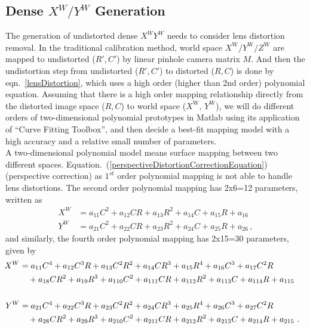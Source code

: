 \subsection{Dense \(X^W/Y^W\) Generation}
\indent
The generation of undistorted dense \(X^WY^W\) needs to consider lens distortion removal. In the traditional calibration method, world space \(X^\text{W}/Y^\text{W}/Z^\text{W}\) are mapped to undistorted (\(R', C'\)) by linear pinhole camera matrix \(M\). And then the undistortion step from undistorted (\(R', C'\)) to distorted (\(R, C\)) is done by eqn.~\ref{lensDistortion}, which uses a high order (higher than 2nd order) polynomial equation. Assuming that there is a high order mapping relationship directly from the distorted image space (\(R, C\)) to world space (\(X^\text{W}, \, Y^\text{W}\)), we will do different orders of two-dimensional polynomial prototypes in Matlab using its application of \enquote{Curve Fitting Toolbox}, and then decide a best-fit mapping model with a high accuracy and a relative small number of parameters.
%
\\\indent
A two-dimensional polynomial model means surface mapping between two different spaces. Equation.~(\ref{perspectiveDistortionCorrectionEquation}) (perspective correction) as \(1^{st}\) order polynomial mapping is not able to handle lens distortions. 
%
The second order polynomial mapping has 2x6=12 parameters, written as %
%
\begin{equation}
\begin{aligned}
X^W &=  a_{11}C^2 + a_{12}CR + a_{13}R^2 + a_{14}C + a_{15}R + a_{16}
\\%
Y^W &=  a_{21}C^2 + a_{22}CR + a_{23}R^2 + a_{24}C + a_{25}R + a_{26} \, , 
\end{aligned}
\label{secondOrderPolynomial}
\end{equation}%
%
\noindent
and similarly, the fourth order polynomial mapping has 2x15=30 parameters, given by 
%
\begin{equation}
\hspace*{-0.3cm}%
\begin{aligned}
X^W &=  a_{11}C^4 + a_{12}C^3R + a_{13}C^2R^2 + a_{14}CR^3 + a_{15}R^4 + a_{16}C^3 + a_{17}C^2R \\%
&\,\,\,\,\,\,+ a_{18}CR^2 + a_{19}R^3 + a_{110}C^2 + a_{111}CR + a_{112}R^2 + a_{113}C + a_{114}R + a_{115}
\\\\%
Y^W &=  a_{21}C^4 + a_{22}C^3R + a_{23}C^2R^2 + a_{24}CR^3 + a_{25}R^4 + a_{26}C^3 + a_{27}C^2R \\%
&\,\,\,\,\,\,+ a_{28}CR^2 + a_{29}R^3 + a_{210}C^2 + a_{211}CR + a_{212}R^2 + a_{213}C + a_{214}R + a_{215}      \,\,.
\end{aligned}
\label{fourthOrderPolynomial}
\end{equation}%
